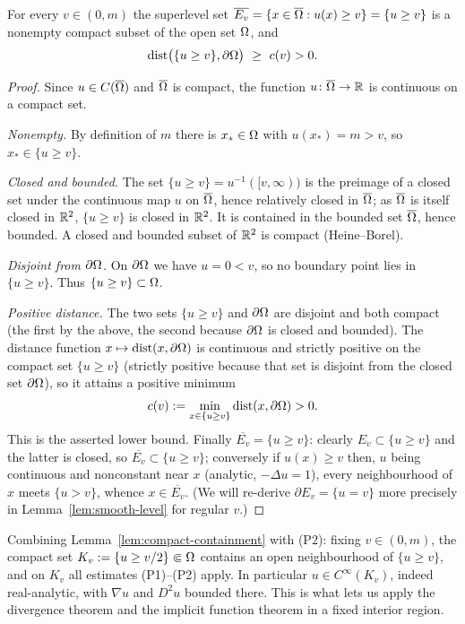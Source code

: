 \begin{lemma}\label{lem:compact-containment}
For every $v\in(0,m)$ the superlevel set
$\overline{E_v}=\{x\in\overline{\Omega}:u(x)\ge v\}=\{u\ge v\}$ is a nonempty
compact subset of the open set $\Omega$, and
\[
  \operatorname{dist}\bigl(\{u\ge v\},\partial\Omega\bigr)\ \ge\ c(v)>0 .
\]
\end{lemma}

\begin{proof}
Since $u\in C(\overline{\Omega})$ and $\overline{\Omega}$ is compact, the function
$u\colon\overline{\Omega}\to\mathbb{R}$ is continuous on a compact set.

\emph{Nonempty.} By definition of $m$ there is $x_*\in\Omega$ with $u(x_*)=m>v$,
so $x_*\in\{u\ge v\}$.

\emph{Closed and bounded.} The set $\{u\ge v\}=u^{-1}([v,\infty))$ is the
preimage of a closed set under the continuous map $u$ on $\overline{\Omega}$, hence
relatively closed in $\overline{\Omega}$; as $\overline{\Omega}$ is itself closed in
$\mathbb{R}^2$, $\{u\ge v\}$ is closed in $\mathbb{R}^2$. It is contained in the bounded set
$\overline{\Omega}$, hence bounded. A closed and bounded subset of $\mathbb{R}^2$ is
compact (Heine--Borel).

\emph{Disjoint from $\partial\Omega$.} On $\partial\Omega$ we have $u=0<v$, so no
boundary point lies in $\{u\ge v\}$. Thus $\{u\ge v\}\subset\Omega$.

\emph{Positive distance.} The two sets $\{u\ge v\}$ and $\partial\Omega$ are
disjoint and both compact (the first by the above, the second because
$\partial\Omega$ is closed and bounded). The distance function
$x\mapsto\operatorname{dist}(x,\partial\Omega)$ is continuous and strictly
positive on the compact set $\{u\ge v\}$ (strictly positive because that set
is disjoint from the closed set $\partial\Omega$), so it attains a positive
minimum
\[
  c(v):=\min_{x\in\{u\ge v\}}\operatorname{dist}(x,\partial\Omega)>0 .
\]
This is the asserted lower bound. Finally
$\overline{E_v}=\{u\ge v\}$: clearly $E_v\subset\{u\ge v\}$ and the latter is
closed, so $\overline{E_v}\subset\{u\ge v\}$; conversely if $u(x)\ge v$ then,
$u$ being continuous and nonconstant near $x$ (analytic, $-\Delta u=1$), every
neighbourhood of $x$ meets $\{u>v\}$, whence $x\in\overline{E_v}$. (We will
re-derive $\partial E_v=\{u=v\}$ more precisely in
Lemma~\ref{lem:smooth-level} for regular $v$.)
\end{proof}

\begin{remark}\label{rem:uniform-c2}
Combining Lemma~\ref{lem:compact-containment} with (P2): fixing
$v\in(0,m)$, the compact set $K_v:=\{u\ge v/2\}\Subset\Omega$ contains an open
neighbourhood of $\{u\ge v\}$, and on $K_v$ all estimates (P1)--(P2) apply.
In particular $u\in C^\infty(K_v)$, indeed real-analytic, with $\nabla u$ and
$D^2u$ bounded there. This is what lets us apply the divergence theorem and
the implicit function theorem in a fixed interior region.
\end{remark}

